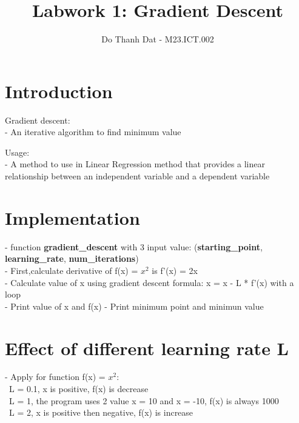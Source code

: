 \documentclass{article}
\title{Labwork 1: Gradient Descent}
\author {Do Thanh Dat - M23.ICT.002}
\begin{document}
\maketitle

\setlength\parindent{0pt}

\section{Introduction}

Gradient descent: \\
- An iterative algorithm to find minimum value

Usage: \\
- A method to use in Linear Regression method that provides a linear relationship between an independent variable and a dependent variable

\section{Implementation}
- function \textbf{gradient\_descent} with 3 input value: (\textbf{starting\_point}, \textbf{learning\_rate}, \textbf{num\_iterations})\\
- First,calculate derivative of f(x) = $x^2$ is f'(x) = 2x\\
- Calculate value of x using gradient descent formula: x = x - L * f'(x) with a loop\\
- Print value of x and f(x)
- Print minimum point and minimun value


\section{Effect of different learning rate L}
- Apply for function f(x) = $x^2$: \\
\textbullet\ L = 0.1, x is positive, f(x) is decrease\\
\textbullet\ L = 1, the program uses 2 value x = 10 and x = -10, f(x) is always 1000\\
\textbullet\ L = 2, x is positive then negative, f(x) is increase
\end{document}

